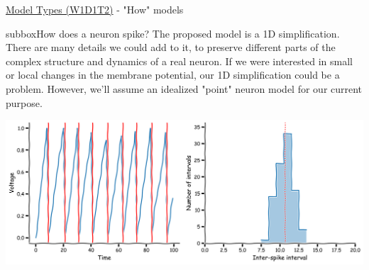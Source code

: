 \begin{textbox}{\href{https://compneuro.neuromatch.io/tutorials/W1D1_ModelTypes/student/W1D1_Tutorial2.html}{Model Types (W1D1T2)} -  "How" models}
\begin{subbox}{subbox}{How does a neuron spike? }
The proposed model is a 1D simplification. There are many details we could add to it, to preserve different parts of the complex structure and dynamics of a real neuron. If we were interested in small or local changes in the membrane potential, our 1D simplification could be a problem. However, we'll assume an idealized "point" neuron model for our current purpose.
\begin{center}
    
\includegraphics[scale=0.08]{Figures/MT/MT_Figure5.png}
\end{center}
\end{subbox}
\end{textbox}

